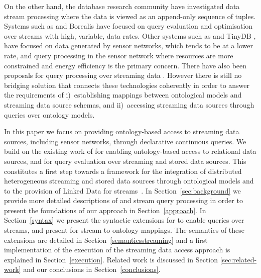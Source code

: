 On the other hand, the database research community have investigated data stream processing where the data is viewed as an append-only sequence of tuples.
Systems such as \stream \cite{Arasu_06a} and Borealis \cite{Abadi_2005} have focused on query evaluation and optimisation over streams with high, variable, data rates.
Other systems such as \snee \cite{Galpin_09} and TinyDB \cite{Madden_05}, have focused on data generated by sensor networks, which tends to be at a lower rate, and query processing in the sensor network where resources are more constrained and energy efficiency is the primary concern.
There have also been proposals for query processing over streaming \rdf data \cite{Bolles_08,Barbieri2010An-Execution-En}.
However there is still no bridging solution that connects these technologies coherently in order to answer the requirements of %
i)~establishing mappings between ontological models and streaming data source schemas, and %
ii)~accessing streaming data sources through queries over ontology models.

In this paper we focus on providing ontology-based access to streaming data sources, including sensor networks, through declarative continuous queries.
We build on the existing work of \rtwoo for enabling ontology-based access to relational data sources, and \snee for query evaluation over streaming and stored data sources.
This constitutes a first step towards a framework for the integration of distributed heterogeneous streaming and stored data sources through ontological models and to the provision of Linked Data for streams~\cite{LePhuoc_09,Page_09,Sequeda_09}.
In Section~\ref{sec:background} we provide more detailed descriptions of \rtwoo and stream query processing in order to present the foundations of our approach in Section~\ref{approach}. 
In Section~\ref{syntax} we present the syntactic extensions for \sparql to enable queries over \rdf streams, and present \stwoo for stream-to-ontology mappings. 
The semantics of these extensions are detailed in Section~\ref{semanticsstreaming} and a first implementation of the execution of the streaming data access approach is explained in Section~\ref{execution}.
Related work is discussed in Section \ref{sec:related-work} and our conclusions in Section~\ref{conclusions}. 


